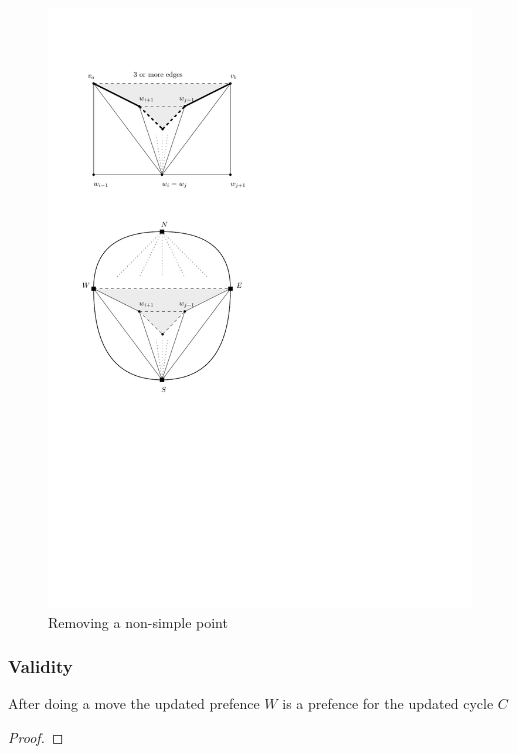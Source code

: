   \begin{figure}[h!]
  \centering
  \includegraphics[scale=1]{redAlgo/img/removeNonSimplePoint}

  \caption{Removing a non-simple point
      \label{fig:removeNonSimplePoint}}
  \end{figure}

  \subsubsection{Validity}
  \label{ss:validity}

  \begin{lemma}
  After doing a move the updated prefence $W$ is a prefence for the updated cycle $C$
  \end{lemma}
  \begin{proof}
  \end{proof}

